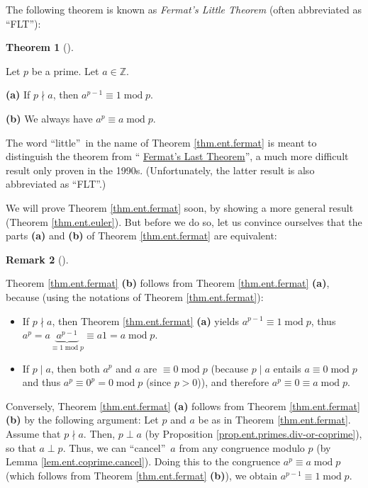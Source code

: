 \documentclass[numbers=enddot,12pt,final,onecolumn,notitlepage]{scrartcl}%
\numberwithin{exer}{subsection}
\theoremstyle{definition}
\newtheorem{theo}{Theorem}[subsection]
\newenvironment{theorem}[1][]
{\begin{theo}[#1]\begin{leftbar}}
{\end{leftbar}\end{theo}}
\newtheorem{remk}[theo]{Remark}
\newenvironment{remark}[1][]
{\begin{remk}[#1]\begin{leftbar}}
{\end{leftbar}\end{remk}}
\begin{document}
The following theorem is known as \textit{Fermat's Little Theorem} (often
abbreviated as \textquotedblleft FLT\textquotedblright):

\begin{theorem}
\label{thm.ent.fermat}Let $p$ be a prime. Let $a\in\mathbb{Z}$.

\textbf{(a)} If $p\nmid a$, then $a^{p-1}\equiv1\operatorname{mod}p$.

\textbf{(b)} We always have $a^{p}\equiv a\operatorname{mod}p$.
\end{theorem}

The word \textquotedblleft little\textquotedblright\ in the name of Theorem
\ref{thm.ent.fermat} is meant to distinguish the theorem from
\textquotedblleft%
\href{https://en.wikipedia.org/wiki/Fermat's_Last_Theorem}{Fermat's Last
Theorem}\textquotedblright, a much more difficult result only proven in the
1990s. (Unfortunately, the latter result is also abbreviated as
\textquotedblleft FLT\textquotedblright.)

We will prove Theorem \ref{thm.ent.fermat} soon, by showing a more general
result (Theorem \ref{thm.ent.euler}). But before we do so, let us convince
ourselves that the parts \textbf{(a)} and \textbf{(b)} of Theorem
\ref{thm.ent.fermat} are equivalent:

\begin{remark}
Theorem \ref{thm.ent.fermat} \textbf{(b)} follows from Theorem
\ref{thm.ent.fermat} \textbf{(a)}, because (using the notations of Theorem
\ref{thm.ent.fermat}):

\begin{itemize}
\item If $p\nmid a$, then Theorem \ref{thm.ent.fermat} \textbf{(a)} yields
$a^{p-1}\equiv1\operatorname{mod}p$, thus $a^{p}=a\underbrace{a^{p-1}}%
_{\equiv1\operatorname{mod}p}\equiv a1=a\operatorname{mod}p$.

\item If $p\mid a$, then both $a^{p}$ and $a$ are $\equiv0\operatorname{mod}p$
(because $p\mid a$ entails $a\equiv0\operatorname{mod}p$ and thus $a^{p}%
\equiv0^{p}=0\operatorname{mod}p$ (since $p>0$)), and therefore $a^{p}%
\equiv0\equiv a\operatorname{mod}p$.
\end{itemize}

Conversely, Theorem \ref{thm.ent.fermat} \textbf{(a)} follows from Theorem
\ref{thm.ent.fermat} \textbf{(b)} by the following argument: Let $p$ and $a$
be as in Theorem \ref{thm.ent.fermat}. Assume that $p\nmid a$. Then, $p\perp
a$ (by Proposition \ref{prop.ent.primes.div-or-coprime}), so that $a\perp p$.
Thus, we can \textquotedblleft cancel\textquotedblright\ $a$ from any
congruence modulo $p$ (by Lemma \ref{lem.ent.coprime.cancel}). Doing this to
the congruence $a^{p}\equiv a\operatorname{mod}p$ (which follows from Theorem
\ref{thm.ent.fermat} \textbf{(b)}), we obtain $a^{p-1}\equiv
1\operatorname{mod}p$.
\end{remark}
\end{document}
